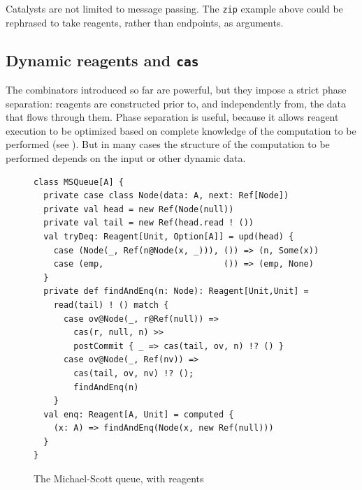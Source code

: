 \documentclass[preprint]{sigplanconf}
\begin{document}
Catalysts are not limited to message passing.  The \lstinline{zip} example
above could be rephrased to take reagents, rather than endpoints, as
arguments.  



\subsection{Dynamic reagents and \lstinline{cas}}
\label{sec:dynamic}

The combinators introduced so far are powerful, but they impose a strict phase
separation: reagents are constructed prior to, and independently from, the
data that flows through them.  Phase separation is useful, because it allows
reagent execution to be optimized based on complete knowledge of the
computation to be performed (see ).  But in many cases
the structure of the computation to be performed depends on the input or other
dynamic data.

\begin{figure}
\begin{lstlisting}
class MSQueue[A] {
  private case class Node(data: A, next: Ref[Node])
  private val head = new Ref(Node(null))
  private val tail = new Ref(head.read ! ())
  val tryDeq: Reagent[Unit, Option[A]] = upd(head) {
    case (Node(_, Ref(n@Node(x, _))), ()) => (n, Some(x))
    case (emp,                        ()) => (emp, None)
  }
  private def findAndEnq(n: Node): Reagent[Unit,Unit] = 
    read(tail) ! () match {
      case ov@Node(_, r@Ref(null)) => 
        cas(r, null, n) >>
        postCommit { _ => cas(tail, ov, n) !? () }
      case ov@Node(_, Ref(nv)) => 
        cas(tail, ov, nv) !? (); 
        findAndEnq(n)
    }
  val enq: Reagent[A, Unit] = computed { 
    (x: A) => findAndEnq(Node(x, new Ref(null)))
  }
}
\end{lstlisting}
\nocaptionrule
\caption{The Michael-Scott queue, with reagents}
\label{fig:msqueue}
\end{figure}
\end{document}

